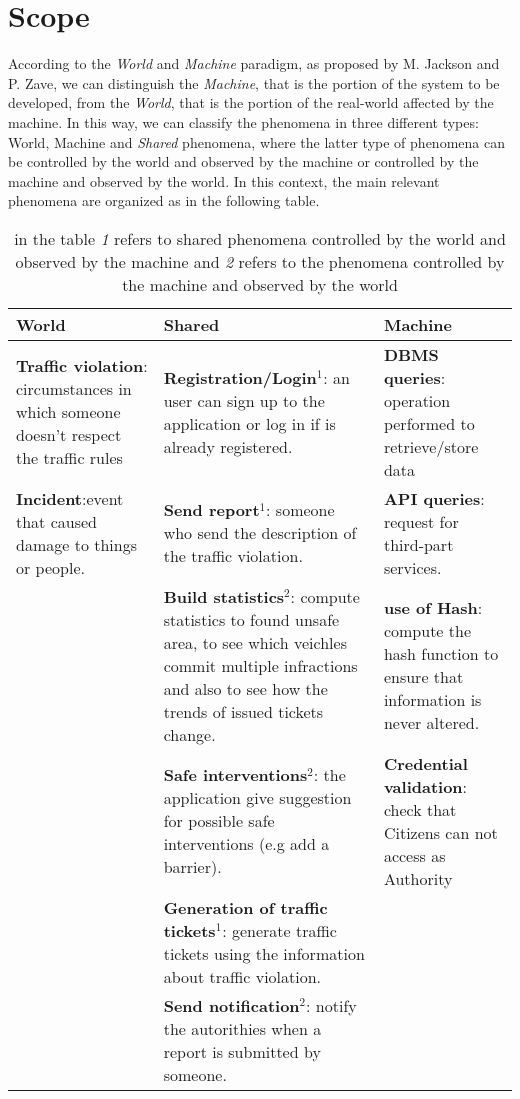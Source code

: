 \documentclass{report}
\begin{document}
\section{Scope}
According to the \textit{World} and \textit{Machine} paradigm, as proposed by M. Jackson and P. Zave, we can distinguish the \textit{Machine}, that is the portion of the system to be developed, from the \textit{World}, that is the portion of the real-world affected by the machine. In this way, we can classify the phenomena in three different types: World, Machine and \textit{Shared} phenomena, where the latter type of phenomena can be controlled by the world and observed by the machine or controlled by the machine and observed by the world.
\newline
In this context, the main relevant phenomena are organized as in the following table.
\begin{table}[h!]
		\begin{center}
		\begin{tabular}{|C{3.5cm}|C{3.5cm}|C{3.5cm}|}
			\toprule
			\textbf{World} &\textbf{Shared}& \textbf{Machine}\\
			\midrule
			\textbf{Traffic violation}: circumstances in which someone doesn't respect the traffic rules&\textbf{Registration/Login}$^{1}$: an user can sign up to the application or log in if is already registered.&\textbf{DBMS queries}: operation performed to retrieve/store data\\
			\midrule
			\textbf{Incident}:event that caused damage to things or people.&\textbf{Send report}$^{1}$: someone who send the description of the traffic violation.&\textbf{API queries}: request for third-part services.\\
			\midrule
			&\textbf{Build statistics}$^{2}$: compute statistics to found unsafe area, to see which veichles commit multiple infractions and also to see how the trends of issued tickets change.&\textbf{use of Hash}: compute the hash function to ensure that information is never altered.\\
			\midrule
			&\textbf{Safe interventions}$^{2}$: the application give suggestion for possible safe interventions (e.g add a barrier).&\textbf{Credential validation}: check that Citizens can not access as Authority\\ 
			\midrule
			&\textbf{Generation of traffic tickets}$^{1}$: generate traffic tickets using the information about traffic violation.&	\\			
			\midrule
			&\textbf{Send notification}$^{2}$: notify the autorithies when a report is submitted by someone.&\\
			\bottomrule
		\end{tabular}
		\end{center}
		\caption{in the table \textit{1} refers to shared phenomena controlled by the world and observed by the machine and \textit{2} refers to the phenomena controlled by the machine and observed by the world}
		\label{tab:multicol}
	\end{table}
  
\end{document}
